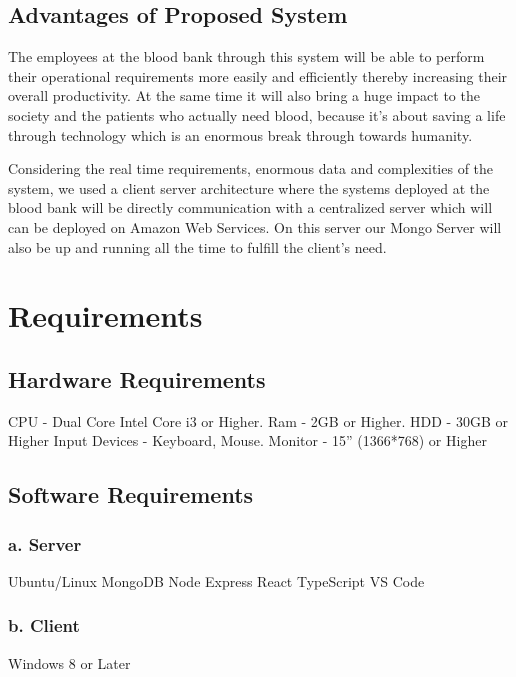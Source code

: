 \documentclass[BTech]{srmuthesis}
\begin{document}
\subsection{Advantages of Proposed System}
The employees at the blood bank through this system will be able to perform their operational requirements more easily and efficiently thereby increasing their overall productivity. At the same time it will also bring a huge impact to the society and the patients who actually need blood, because it's about saving a life through technology which is an enormous break through towards humanity.\par 
Considering the real time requirements, enormous data and complexities of the system, we used a client server architecture where the systems deployed at the blood bank will be directly communication with a centralized server which will can be deployed on Amazon Web Services. On this server our Mongo Server will also be up and running all the time to fulfill the client's need.
\section{Requirements}
\subsection{Hardware Requirements}
CPU - Dual Core Intel Core i3 or Higher.
\newline
Ram - 2GB or Higher.
\newline
HDD - 30GB or Higher
\newline
Input Devices - Keyboard, Mouse.
\newline
Monitor - 15” (1366*768) or Higher
\subsection{Software Requirements}
\subsubsection{a. Server}
Ubuntu/Linux
\newline
MongoDB
\newline
Node
\newline
Express
\newline
React
\newline
TypeScript 
\newline
VS Code
\subsubsection{b. Client}
Windows 8 or Later
\end{document}

